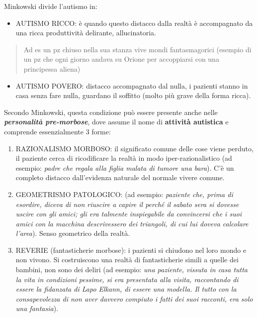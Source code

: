 \documentclass[]{article}
\begin{document}
Minkowski divide l'autismo in:

\begin{itemize}
\item
  AUTISMO RICCO: è quando questo distacco dalla realtà è accompagnato da
  una ricca produttività delirante, allucinatoria.
\end{itemize}

\begin{quote}
Ad es un pz chiuso nella sua stanza vive mondi fantasmagorici (esempio
di un pz che ogni giorno andava su Orione per accoppiarsi con una
principessa aliena)
\end{quote}

\begin{itemize}
\item
  AUTISMO POVERO: distacco accompagnato dal nulla, i pazienti stanno in
  casa senza fare nulla, guardano il soffitto (molto più grave della
  forma ricca).
\end{itemize}

Secondo Minkowski, questa condizione può essere presente anche nelle
\textbf{\emph{personalità pre-morbose}}, dove assume il nome di
\textbf{attività autistica} e comprende essenzialmente 3 forme:

\begin{enumerate}
\def\labelenumi{\arabic{enumi}.}
\item
  RAZIONALISMO MORBOSO: il significato comune delle cose viene perduto,
  il paziente cerca di ricodificare la realtà in modo
  iper-razionalistico (ad esempio: \emph{padre che regala alla figlia
  malata di tumore una bara}). C'è un completo distacco dall'evidenza
  naturale del normale vivere comune.
\item
  GEOMETRISMO PATOLOGICO: (ad esempio: \emph{paziente che, prima di
  esordire, diceva di non riuscire a capire il perché il sabato sera si
  dovesse uscire con gli amici; gli era talmente inspiegabile da
  convincersi che i suoi amici con la macchina descrivessero dei
  triangoli, di cui lui doveva calcolare l'area}). Senso geometrico
  della realtà.
\item
  REVERIE (fantasticherie morbose): i pazienti si chiudono nel loro
  mondo e non vivono. Si costruiscono una realtà di fantasticherie
  simili a quelle dei bambini, non sono dei deliri (ad esempio:
  \emph{una paziente, vissuta in casa tutta la vita in condizioni
  pessime, si era presentata alla visita, raccontando di essere la
  fidanzata di Lapo Elkann, di essere una modella. Il tutto con la
  consapevolezza di non aver davvero compiuto i fatti dei suoi racconti,
  era solo una fantasia}).
\end{enumerate}
\end{document}
